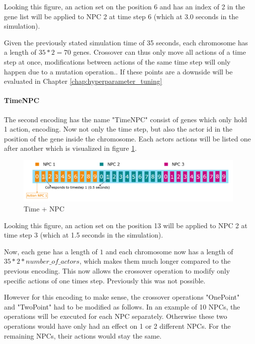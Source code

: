 Looking this figure, an action set on the position 6 and has an index of 2 in the gene list will be applied to NPC 2 at time step 6 (which at 3.0 seconds in the simulation).


Given the previously stated simulation time of 35 seconds, each chromosome has a length of $35 * 2 = 70$ genes.
Crossover can thus only move all actions of a time step at once, modifications between actions of the same time step will only happen due to a mutation operation.. If these points are a downside will be evaluated in Chapter \ref{chap:hyperparameter_tuning}


\paragraph{TimeNPC}
The second encoding has the name "TimeNPC" consist of genes which only hold 1 action, encoding. Now not only the time step, but also the actor id in the position of the gene inside the chromosome. Each actors actions will be listed one after another which is visualized in figure \ref{figure:encoding:chromosome:time_npc}.

\begin{figure}[ht] 
	\includegraphics[width=1\linewidth]{figures/time_npc_encoding}
	\caption{Time + NPC}
	\label{figure:encoding:chromosome:time_npc}
\end{figure}

Looking this figure, an action set on the position 13 will be applied to NPC 2 at time step 3 (which at 1.5 seconds in the simulation).


Now, each gene has a length of $1$ and each chromosome now has a length of $35 * 2 * number\_of\_actors$, which makes them much longer compared to the previous encoding. This now allows the crossover operation to modify only specific actions of one times step. Previously this was not possible.

However for this encoding to make sense, the crossover operations "OnePoint" and "TwoPoint" had to be modified as follows. In an example of 10 NPCs, the operations will be executed for each NPC separately. Otherwise these two operations would have only had an effect on 1 or 2 different NPCs. For the remaining NPCs, their actions would stay the same.

